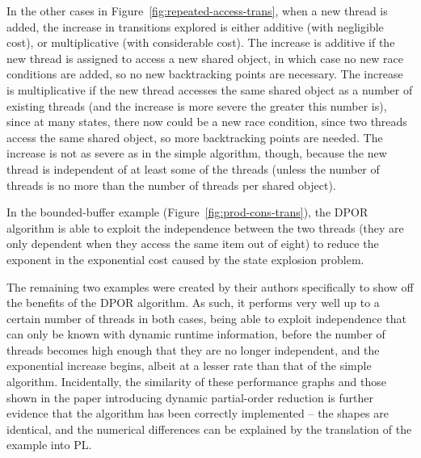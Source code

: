 \documentclass[12pt,a4paper,twoside,openright]{report}
\begin{document}
In the other cases in
Figure~\ref{fig:repeated-access-trans},
when a new thread is added, the increase
in transitions explored
is either additive (with negligible cost),
or multiplicative (with considerable cost).
The increase is additive if the new thread
is assigned to access a new shared object,
in which case no new race conditions are
added, so no new backtracking points are
necessary. The increase is multiplicative
if the new thread accesses the same shared
object as a number of existing threads
(and the increase is more severe the greater
this number is), since at many states, there
now could be a new race condition, since
two threads access the same shared object,
so more backtracking points are needed.
The increase is not as severe as in the
simple algorithm, though, because the new
thread is independent of at least some of
the threads (unless the number of threads
is no more than the number of threads
per shared object).

In the bounded-buffer example
(Figure~\ref{fig:prod-cons-trans}),
the DPOR algorithm is able to exploit
the independence between the two threads
(they are only dependent when they
access the same item out of eight) to
reduce the exponent in the
exponential cost caused by the
state explosion problem.

The remaining two examples were created
by their authors specifically to show
off the benefits of the DPOR algorithm.
As such, it performs very well up to
a certain number of threads in both cases,
being able to exploit independence that can
only be known with dynamic runtime information,
before the number of threads becomes high enough
that they are no longer independent, and the
exponential increase begins, albeit at a lesser
rate than that of the simple algorithm.
Incidentally, the similarity of these performance
graphs and those shown in the paper introducing
dynamic partial-order reduction \cite{flan05}
is further evidence that the algorithm has
been correctly implemented -- the shapes
are identical, and the numerical
differences can be explained by the
translation of the example into PL.
\end{document}
